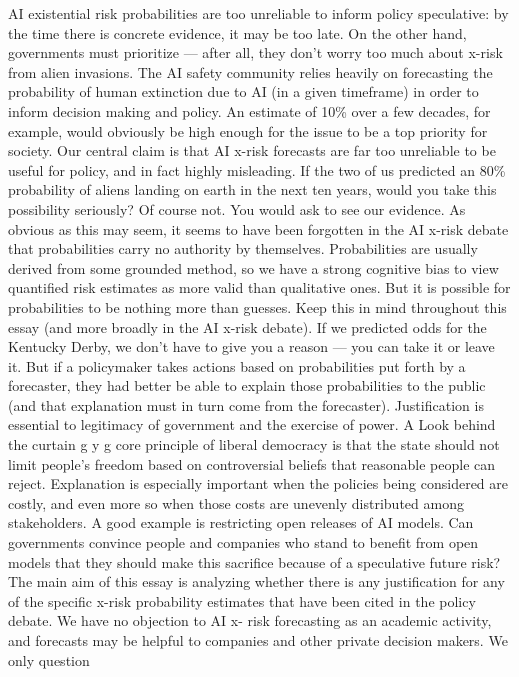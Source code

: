 AI existential risk probabilities
are too unreliable to inform policy
speculative: by the time there is concrete evidence, it may be too late.
On the other hand, governments must prioritize — after all, they don’t
worry too much about x-risk from alien invasions.
The AI safety community relies heavily on forecasting the probability
of human extinction due to AI (in a given timeframe) in order to
inform decision making and policy. An estimate of 10\% over a few
decades, for example, would obviously be high enough for the issue
to be a top priority for society.
Our central claim is that AI x-risk forecasts are far too unreliable to be
useful for policy, and in fact highly misleading.
If the two of us predicted an 80\% probability of aliens landing on
earth in the next ten years, would you take this possibility seriously?
Of course not. You would ask to see our evidence. As obvious as this
may seem, it seems to have been forgotten in the AI x-risk debate
that probabilities carry no authority by themselves. Probabilities are
usually derived from some grounded method, so we have a strong
cognitive bias to view quantiﬁed risk estimates as more valid than
qualitative ones. But it is possible for probabilities to be nothing more
than guesses. Keep this in mind throughout this essay (and more
broadly in the AI x-risk debate).
If we predicted odds for the Kentucky Derby, we don’t have to give
you a reason — you can take it or leave it. But if a policymaker takes
actions based on probabilities put forth by a forecaster, they had
better be able to explain those probabilities to the public (and that
explanation must in turn come from the forecaster). Justiﬁcation is
essential to legitimacy of government and the exercise of power. A
Look behind the curtain
g
y
g
core principle of liberal democracy is that the state should not limit
people’s freedom based on controversial beliefs that reasonable
people can reject.
Explanation is especially important when the policies being
considered are costly, and even more so when those costs are
unevenly distributed among stakeholders. A good example is
restricting open releases of AI models. Can governments convince
people and companies who stand to beneﬁt from open models that
they should make this sacriﬁce because of a speculative future risk?
The main aim of this essay is analyzing whether there is any
justiﬁcation for any of the speciﬁc x-risk probability estimates that
have been cited in the policy debate. We have no objection to AI x-
risk forecasting as an academic activity, and forecasts may be helpful
to companies and other private decision makers. We only question
